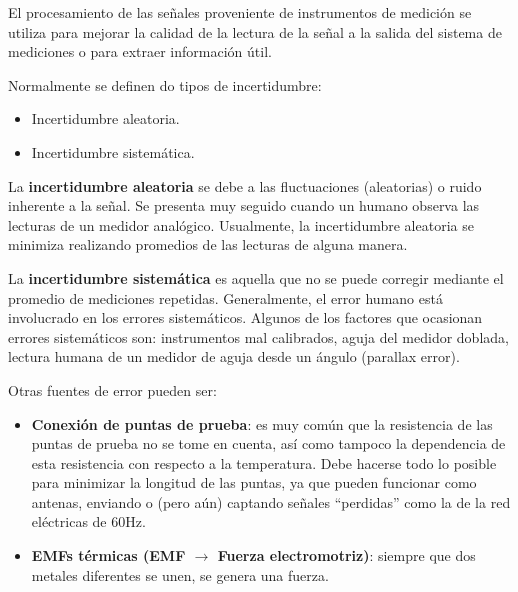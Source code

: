 \documentclass[12pt, letterpaper]{extarticle}
\begin{document}

El procesamiento de las señales proveniente de instrumentos de medición se utiliza para mejorar la calidad de la lectura de la señal a la salida del sistema de mediciones o para extraer información útil.



Normalmente se definen do tipos de incertidumbre:
\begin{itemize}
    \item Incertidumbre aleatoria.
    \item Incertidumbre sistemática.
\end{itemize}

La \textbf{incertidumbre aleatoria} se debe a las fluctuaciones (aleatorias) o ruido inherente a la señal. Se presenta muy seguido cuando un humano observa las lecturas de un medidor analógico. Usualmente, la incertidumbre aleatoria se minimiza realizando promedios de las lecturas de alguna manera.

La \textbf{incertidumbre sistemática} es aquella que no se puede corregir mediante el promedio de mediciones repetidas. Generalmente, el error humano está involucrado en los errores sistemáticos. Algunos de los factores que ocasionan errores sistemáticos son: instrumentos mal calibrados, aguja del medidor doblada, lectura humana de un medidor de aguja desde un ángulo (parallax error).

Otras fuentes de error pueden ser:
\begin{itemize}
    \item \textbf{Conexión de puntas de prueba}: es muy común que la resistencia de las puntas de prueba no se tome en cuenta, así como tampoco la dependencia de esta resistencia con respecto a la temperatura. Debe hacerse todo lo posible para minimizar la longitud de las puntas, ya que pueden funcionar como antenas, enviando o (pero aún) captando señales ``perdidas'' como la de la red eléctricas de 60Hz.
    \item \textbf{EMFs térmicas (EMF $\rightarrow$ Fuerza electromotriz)}: siempre que dos metales diferentes se unen, se genera una fuerza.
\end{itemize}

\end{document}
